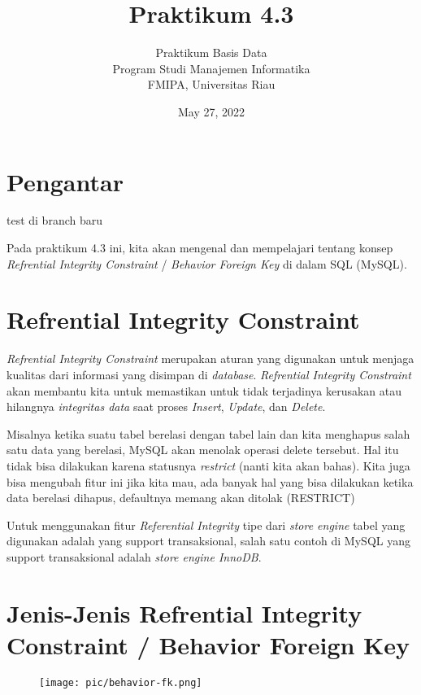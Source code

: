 \documentclass[a4paper]{article}
\title{Praktikum 4.3}
\author{Praktikum Basis Data\\ Program Studi Manajemen Informatika \\ FMIPA, Universitas Riau }
\date{May 27, 2022}
\begin{document}
\maketitle

\section{Pengantar}%
\label{sec:pengantar}

test di branch baru

Pada praktikum 4.3 ini, kita akan mengenal dan mempelajari tentang konsep \textit{Refrential Integrity Constraint} /  \textit{Behavior Foreign Key} di dalam SQL (MySQL).

\section{Refrential Integrity Constraint}%
\label{sec:section_name}

\textit{Refrential Integrity Constraint} merupakan aturan yang digunakan untuk menjaga kualitas dari informasi yang disimpan di \textit{database}. \textit{Refrential  Integrity Constraint} akan membantu kita untuk memastikan untuk tidak terjadinya kerusakan atau hilangnya \textit{integritas data} saat proses \textit{Insert}, \textit{Update}, dan \textit{Delete}.

Misalnya ketika suatu tabel berelasi dengan tabel lain dan kita menghapus salah satu data yang berelasi, MySQL akan menolak operasi delete tersebut. Hal itu tidak bisa dilakukan karena statusnya \textit{restrict} (nanti kita akan bahas).  Kita juga bisa mengubah fitur ini jika kita mau, ada banyak hal yang bisa dilakukan ketika data berelasi dihapus, defaultnya memang akan ditolak (RESTRICT)

Untuk menggunakan fitur \textit{Referential Integrity} tipe dari \textit{store engine} tabel yang digunakan adalah yang support transaksional, salah satu contoh di MySQL yang support transaksional adalah \textit{store engine InnoDB}. 

\section{Jenis-Jenis Refrential Integrity Constraint / Behavior Foreign Key}%
\label{sec:section_name}
\begin{figure}[htpb]
	\centering
	\texttt{[image: pic/behavior-fk.png]}
\end{figure}
\end{document}
